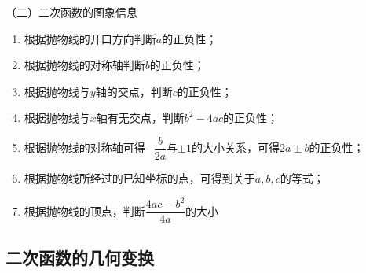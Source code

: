 \documentclass[10pt]{ctexart}
\begin{document}
（二）二次函数的图象信息
\begin{enumerate}
\item 根据抛物线的开口方向判断$a$的正负性；
\item 根据抛物线的对称轴判断$b$的正负性；
\item 根据抛物线与$y$轴的交点，判断$c$的正负性；
\item 根据抛物线与$x$轴有无交点，判断$b^2-4ac$的正负性；
\item 根据抛物线的对称轴可得$-\dfrac{b}{2a}$与$\pm 1$的大小关系，可得$2a\pm b$的正负性；
\item 根据抛物线所经过的已知坐标的点，可得到关于$a,b,c$的等式；
\item 根据抛物线的顶点，判断$\dfrac{4ac-b^2}{4a}$的大小
\end{enumerate}
\subsection{二次函数的几何变换}
\end{document}
